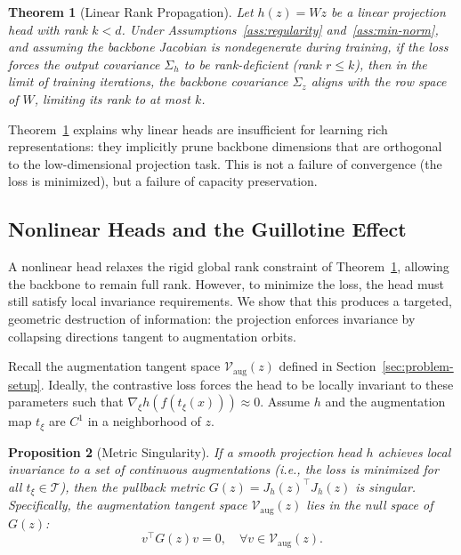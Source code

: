 \documentclass{article}
\theoremstyle{plain}
\newtheorem{theorem}{Theorem}[section]
\newtheorem{proposition}[theorem]{Proposition}
\theoremstyle{definition}
\theoremstyle{remark}
\begin{document}
\begin{theorem}[Linear Rank Propagation]
\label{thm:linear-rank}
Let $h(z) = Wz$ be a linear projection head with rank $k < d$. Under Assumptions~\ref{ass:regularity} and~\ref{ass:min-norm}, and assuming the backbone Jacobian is nondegenerate during training, if the loss forces the output covariance $\Sigma_h$ to be rank-deficient (rank $r \le k$), then in the limit of training iterations, the backbone covariance $\Sigma_z$ aligns with the row space of $W$, limiting its rank to at most $k$.
\end{theorem}

Theorem~\ref{thm:linear-rank} explains why linear heads are insufficient for learning rich representations: they implicitly prune backbone dimensions that are orthogonal to the low-dimensional projection task. This is not a failure of convergence (the loss is minimized), but a failure of capacity preservation.

\subsection{Nonlinear Heads and the Guillotine Effect}

A nonlinear head relaxes the rigid global rank constraint of Theorem~\ref{thm:linear-rank}, allowing the backbone to remain full rank. However, to minimize the loss, the head must still satisfy local invariance requirements. We show that this produces a targeted, geometric destruction of information: the projection enforces invariance by collapsing directions tangent to augmentation orbits.

Recall the augmentation tangent space $\mathcal{V}_{\text{aug}}(z)$ defined in Section~\ref{sec:problem-setup}. Ideally, the contrastive loss forces the head to be locally invariant to these parameters such that $\nabla_\xi h(f(t_\xi(x))) \approx 0$. Assume $h$ and the augmentation map $t_\xi$ are $C^1$ in a neighborhood of $z$.

\begin{proposition}[Metric Singularity]
\label{prop:metric-singularity}
If a smooth projection head $h$ achieves local invariance to a set of continuous augmentations (i.e., the loss is minimized for all $t_\xi \in \mathcal{T}$), then the pullback metric $G(z) = J_h(z)^\top J_h(z)$ is singular. Specifically, the augmentation tangent space $\mathcal{V}_{\text{aug}}(z)$ lies in the null space of $G(z)$:
\begin{equation*}
    v^\top G(z) v = 0, \quad \forall v \in \mathcal{V}_{\text{aug}}(z).
\end{equation*}
\end{proposition}
\end{document}
